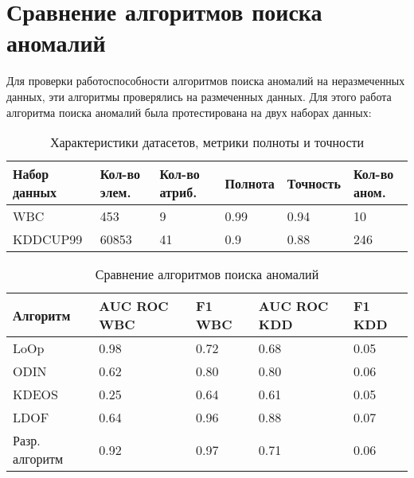 \section{Сравнение  алгоритмов поиска аномалий}
Для проверки работоспособности алгоритмов поиска аномалий на неразмеченных данных, эти алгоритмы проверялись на размеченных данных.
Для этого работа алгоритма поиска аномалий была протестирована на двух наборах данных:
\begin{table}[!h]
	
	\caption{\label{tab:issled1}Характеристики датасетов, метрики полноты и точности}
	
	\begin{center}
		
		\begin{tabular}{|l|l|l|l|l|l|}
			
			\hline
			
			Набор данных& Кол-во элем. & Кол-во атриб. &  Полнота & Точность & Кол-во аном.  \\
			
			\hline 
			
			WBC& 453 & 9 & 0.99&0.94 & 10  \\
			
			\hline
			KDDCUP99 & 60853 & 41 & 0.9&0.88 & 246  \\
			\hline
		
			
		\end{tabular}
		
	\end{center}
	
\end{table}
\begin{table}[h]
	
	\caption{\label{tab:issled2}Сравнение  алгоритмов поиска аномалий}
	
	\begin{center}
		
		\begin{tabular}{|l|l|l|l|l|}
			
			\hline
			
			Алгоритм & AUC ROC WBC & F1 WBC &  AUC ROC KDD & F1 KDD \\
			
			\hline 
			
			LoOp& 0.98 & 0.72 & 0.68& 0.05  \\
			
			\hline
			ODIN & 0.62 & 0.80 & 0.80& 0.06  \\
			
			\hline 
			KDEOS & 0.25	 & 0.64 & 0.61& 0.05  \\
			
			\hline 
			LDOF & 0.64	 & 0.96 & 0.88&0.07  \\
			
			\hline   
			Разр. алгоритм & 0.92	 & 0.97 & 0.71 & 0.06  \\
			
			\hline  
			
		\end{tabular}
		
	\end{center}
	
\end{table}

